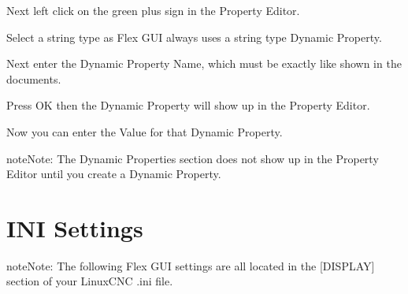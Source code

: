\documentclass[letterpaper,10pt,english]{sphinxmanual}
\begin{document}
\sphinxAtStartPar
Next left click on the green plus sign in the Property Editor.


\sphinxAtStartPar
Select a string type as Flex GUI always uses a string type Dynamic Property.


\sphinxAtStartPar
Next enter the Dynamic Property Name, which must be exactly like shown in the
documents.


\sphinxAtStartPar
Press OK then the Dynamic Property will show up in the Property Editor.


\sphinxAtStartPar
Now you can enter the Value for that Dynamic Property.


\begin{sphinxadmonition}{note}{Note:}
\sphinxAtStartPar
The Dynamic Properties section does not show up in the Property
Editor until you create a Dynamic Property.
\end{sphinxadmonition}

\sphinxstepscope


\chapter{INI Settings}
\label{\detokenize{ini:ini-settings}}\label{\detokenize{ini::doc}}
\sphinxAtStartPar
{}

\begin{sphinxadmonition}{note}{Note:}
\sphinxAtStartPar
The following Flex GUI settings are all located in the {[}DISPLAY{]}
section of your LinuxCNC .ini file.
\end{sphinxadmonition}
\end{document}
